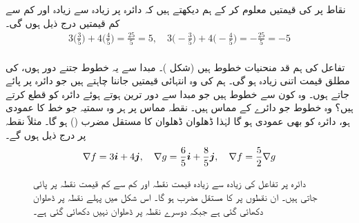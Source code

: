 نقاط    پر  کی قیمتیں معلوم کر کے ہم دیکھتے ہیں کہ دائرہ  پر  زیادہ سے زیادہ  اور کم سے کم قیمتیں درج ذیل ہوں گی۔
\begin{align*}
3\big(\frac{3}{5}\big)+4\big(\frac{4}{5}\big)=\frac{25}{5}=5,\quad  3\big(-\frac{3}{5}\big)+4\big(-\frac{4}{5}\big)=-\frac{25}{5}=-5
\end{align*}  
\\
تفاعل  کی ہم قد منحنیات خطوط  ہیں (شکل )۔ مبدا سے یہ خطوط جتنے دور ہوں،  کی مطلق قیمت اتنی زیادہ ہو گی۔ ہم  کی وہ انتہائی قیمتیں جاننا چاہتے ہیں جو دائرہ  پر پائے جاتے ہوں۔ وہ کون سے خطوط ہیں جو مبدا سے دور ترین ہوتے ہوئے دائرہ کو قطع کرتے ہیں؟ وہ خطوط جو دائرے کے مماس ہیں۔ نقطہ مماس پر ہر وہ سمتیہ  جو  خط  کا عمودی ہو، دائرہ کو بھی عمودی ہو گا لہٰذا ڈھلوان   ڈھلوان  کا مستقل مضرب  ()  ہو گا۔  مثلاً نقطہ  پر درج ذیل ہوں گے۔
\begin{align*}
\nabla f=3{\boldsymbol{i}}+4{\boldsymbol{j}},\quad \nabla g=\frac{6}{5}{\boldsymbol{i}}+\frac{8}{5}{\boldsymbol{j}},\quad \nabla f=\frac{5}{2}\nabla g
\end{align*} 
\begin{figure}
\centering
{}
\caption{
دائرہ  پر تفاعل  کی زیادہ سے زیادہ قیمت نقطہ    اور کم سے کم قیمت نقطہ  پر پائی جاتی ہیں۔ ان نقطوں پر   کا مستقل مضرب  ہو گا۔ اس شکل میں پہلے نقطہ پر ڈھلوان دکھائی گئی ہے جبکہ دوسرے نقطہ پر ڈھلوان نہیں دکھائی گئی ہے۔ 
}
\label{شکل_مثال_کثیرالمتغیر_دائرہ_پر_انتہائی_قیمتیں_درکار}
\end{figure}
